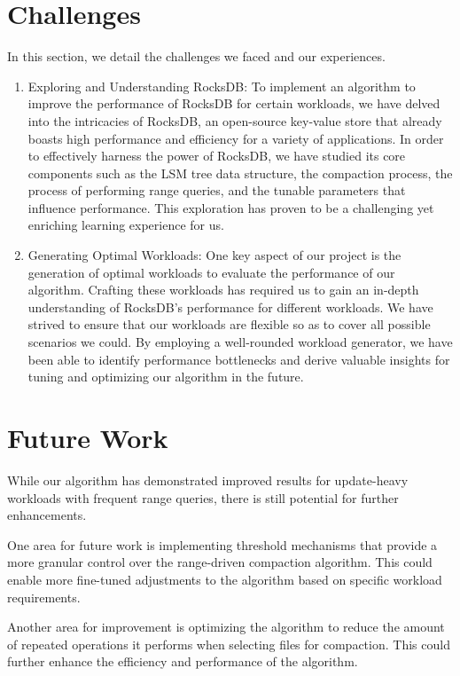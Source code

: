 \documentclass[balance=false, sigconf]{acmart}
\begin{document}
\section{Challenges}
In this section, we detail the challenges we faced and our experiences.

\begin{enumerate}
    \item Exploring and Understanding RocksDB: To implement an algorithm to improve the performance of RocksDB for certain workloads, we have delved into the intricacies of RocksDB, an open-source key-value store that already boasts high performance and efficiency for a variety of applications. In order to effectively harness the power of RocksDB, we have studied its core components such as the LSM tree data structure, the compaction process, the process of performing range queries, and the tunable parameters that influence performance. This exploration has proven to be a challenging yet enriching learning experience for us.

    \item Generating Optimal Workloads: One key aspect of our project is the generation of optimal workloads to evaluate the performance of our algorithm. Crafting these workloads has required us to gain an in-depth understanding of RocksDB's performance for different workloads. We have strived to ensure that our workloads are flexible so as to cover all possible scenarios we could. By employing a well-rounded workload generator, we have been able to identify performance bottlenecks and derive valuable insights for tuning and optimizing our algorithm in the future.
\end{enumerate}
\section{Future Work}
While our algorithm has demonstrated improved results for update-heavy workloads with frequent range queries, there is still potential for further enhancements.

One area for future work is implementing threshold mechanisms that provide a more granular control over the range-driven compaction algorithm. This could enable more fine-tuned adjustments to the algorithm based on specific workload requirements.

Another area for improvement is optimizing the algorithm to reduce the amount of repeated operations it performs when selecting files for compaction. This could further enhance the efficiency and performance of the algorithm.
\end{document}
